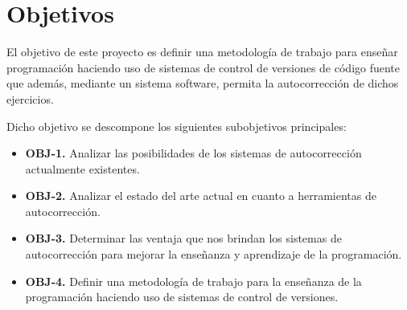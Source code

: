 \chapter{Objetivos}

El objetivo de este proyecto es definir una metodología de trabajo para enseñar programación haciendo uso de sistemas de control de versiones de código fuente que además, mediante un sistema software, permita la autocorrección de dichos ejercicios.







\bigskip
Dicho objetivo se descompone los siguientes subobjetivos principales:

\begin{itemize}
  \item \textbf{OBJ-1.} Analizar las posibilidades de los sistemas de autocorrección actualmente existentes.
  \item \textbf{OBJ-2.} Analizar el estado del arte actual en cuanto a herramientas de autocorrección.
  \item \textbf{OBJ-3.} Determinar las ventaja que nos brindan los sistemas de autocorrección para mejorar la enseñanza y aprendizaje de la programación.
  \item \textbf{OBJ-4.} Definir una metodología de trabajo para la enseñanza de la programación haciendo uso de sistemas de control de versiones.

\end{itemize}

